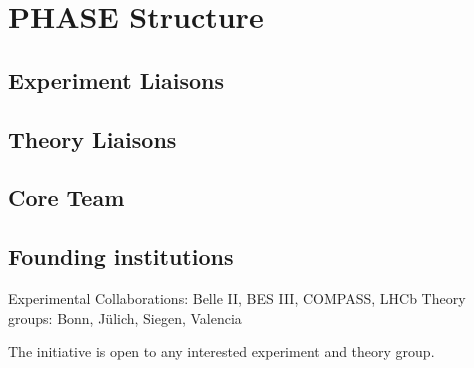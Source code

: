 \section{PHASE Structure}

\subsection{Experiment Liaisons}

\subsection{Theory Liaisons}

\subsection{Core Team}

\subsection{Founding institutions}
Experimental Collaborations: Belle II, BES III, COMPASS, LHCb 
Theory groups: Bonn, J\"ulich, Siegen, Valencia

The initiative is open to any interested experiment and theory group.